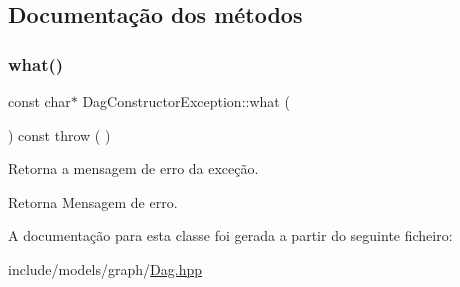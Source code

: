 \subsection{Documentação dos métodos}
\mbox{\label{classDagConstructorException_a3ad88177747ce6ef7273d1196258c7ba}} 
\subsubsection{\texorpdfstring{what()}{what()}}
{\footnotesize\ttfamily const char$\ast$ Dag\+Constructor\+Exception\+::what (\begin{DoxyParamCaption}{ }\end{DoxyParamCaption}) const throw ( ) \hspace{0.3cm}{\ttfamily [inline]}}

Retorna a mensagem de erro da exceção. \begin{DoxyReturn}{Retorna}
Mensagem de erro. 
\end{DoxyReturn}


A documentação para esta classe foi gerada a partir do seguinte ficheiro\+:\begin{DoxyCompactItemize}
\item 
include/models/graph/\mbox{\hyperlink{Dag_8hpp}{Dag.\+hpp}}\end{DoxyCompactItemize}

